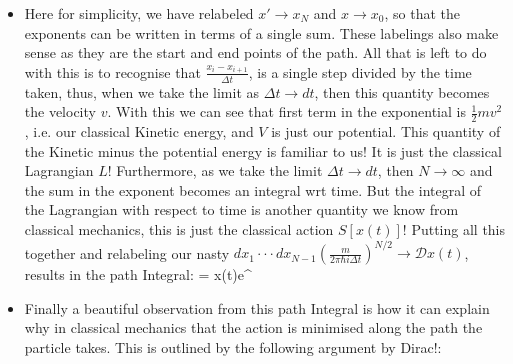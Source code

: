 \documentclass[11pt]{article}
\renewenvironment{flalign}{\empheq[box=\tcbhighmath]{align}}{\endempheq}
\numberwithin{equation}{section}
\begin{document}
\begin{itemize}
 \item  Here for simplicity, we have relabeled $x' \rightarrow x_N$ and $x\rightarrow x_0$, so that the exponents can be written in terms of a single sum. These labelings also make sense as they are the start and end points of the path. All that is left to do with this is to recognise that $\frac{x_i-x_{i+1}}{\Delta t}$, is a single step divided by the time taken, thus, when we take the limit as $\Delta t \rightarrow dt$, then this quantity becomes the velocity $v$. With this we can see that first term in the exponential is $\frac{1}{2}mv^2$, i.e. our classical Kinetic energy, and $V$ is just our potential. This quantity of the Kinetic minus the potential energy is familiar to us! It is just the classical Lagrangian $L$! Furthermore, as we take the limit $\Delta t \rightarrow dt$, then $N\rightarrow \infty$ and the sum in the exponent becomes an integral wrt time. But the integral of the Lagrangian with respect to time is another quantity we know from classical mechanics, this is just the classical action $S[x(t)]$! Putting all this together and relabeling our nasty $dx_1 \cdot\cdot\cdot  dx_{N-1}\left(\frac{m}{2\pi\hbar i\Delta t}\right)^{N/2} \rightarrow \mathcal{D}x(t)$, results in the path Integral: 
\begin{flalign}
  = \int{}x(t)e^{}
\end{flalign}
\item Finally a beautiful observation from this path Integral is how it can explain why in classical mechanics that the action is minimised along the path the particle takes. This is outlined by the following argument by Dirac!: 
\small
\vspace{5mm}



\end{itemize}
\end{document}
